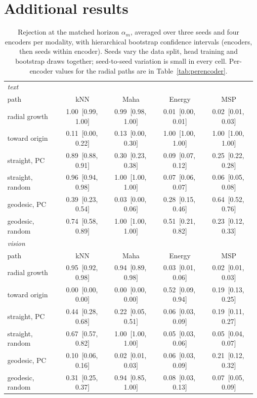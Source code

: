 \documentclass[11pt]{article}
\theoremstyle{definition}
\theoremstyle{remark}
\begin{document}
\section{Additional results}
\begin{table}[!htbp]
\centering
\small
\caption{Rejection at the matched horizon $\alpha_m$, averaged over three seeds and four encoders per modality,
with hierarchical bootstrap confidence intervals (encoders, then seeds within encoder). Seeds vary the data
split, head training and bootstrap draws together; seed-to-seed variation is small in every cell.
Per-encoder values for the radial paths are in Table~\ref{tab:perencoder}.}
\label{tab:matched}
\begin{tabular}{lcccc}
\toprule
\multicolumn{5}{l}{\emph{text}}\\
path & kNN & Maha & Energy & MSP \\
\midrule
radial growth & 1.00 \,[0.99,\,1.00] & 0.99 \,[0.98,\,1.00] & 0.01 \,[0.00,\,0.01] & 0.02 \,[0.01,\,0.03] \\
toward origin & 0.11 \,[0.00,\,0.22] & 0.13 \,[0.00,\,0.30] & 1.00 \,[1.00,\,1.00] & 1.00 \,[1.00,\,1.00] \\
straight, PC & 0.89 \,[0.88,\,0.91] & 0.30 \,[0.23,\,0.38] & 0.09 \,[0.07,\,0.12] & 0.25 \,[0.22,\,0.28] \\
straight, random & 0.96 \,[0.94,\,0.98] & 1.00 \,[1.00,\,1.00] & 0.07 \,[0.06,\,0.07] & 0.06 \,[0.05,\,0.08] \\
geodesic, PC & 0.39 \,[0.23,\,0.54] & 0.03 \,[0.00,\,0.06] & 0.28 \,[0.15,\,0.46] & 0.64 \,[0.52,\,0.76] \\
geodesic, random & 0.74 \,[0.58,\,0.89] & 1.00 \,[1.00,\,1.00] & 0.51 \,[0.21,\,0.82] & 0.23 \,[0.12,\,0.33] \\
\midrule
\multicolumn{5}{l}{\emph{vision}}\\
path & kNN & Maha & Energy & MSP \\
\midrule
radial growth & 0.95 \,[0.92,\,0.98] & 0.94 \,[0.89,\,0.98] & 0.03 \,[0.01,\,0.06] & 0.02 \,[0.01,\,0.03] \\
toward origin & 0.00 \,[0.00,\,0.00] & 0.00 \,[0.00,\,0.00] & 0.52 \,[0.09,\,0.94] & 0.19 \,[0.13,\,0.25] \\
straight, PC & 0.44 \,[0.28,\,0.68] & 0.22 \,[0.05,\,0.51] & 0.06 \,[0.03,\,0.09] & 0.19 \,[0.11,\,0.27] \\
straight, random & 0.67 \,[0.57,\,0.82] & 1.00 \,[1.00,\,1.00] & 0.05 \,[0.03,\,0.06] & 0.05 \,[0.04,\,0.07] \\
geodesic, PC & 0.10 \,[0.06,\,0.16] & 0.02 \,[0.01,\,0.03] & 0.06 \,[0.03,\,0.09] & 0.21 \,[0.12,\,0.32] \\
geodesic, random & 0.31 \,[0.25,\,0.37] & 0.94 \,[0.85,\,1.00] & 0.08 \,[0.03,\,0.13] & 0.07 \,[0.05,\,0.09] \\
\bottomrule
\end{tabular}
\end{table}
\end{document}
